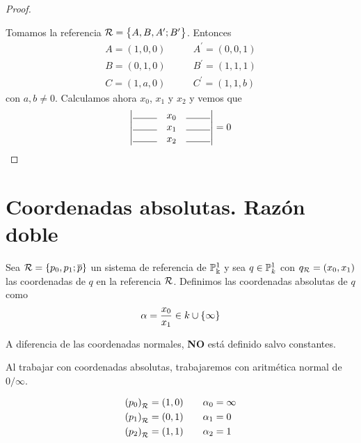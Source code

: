 \begin{proof}
\begin{center}
\end{center}

Tomamos la referencia $\mathcal{R} = \left\{A,B,A^\prime;B^\prime\right\}$. Entonces
\[
\begin{aligned}
A = (1,0,0) &\qquad A^\prime = (0,0,1) \\
B = (0,1,0) &\qquad B^\prime = (1,1,1) \\
C = (1,a,0) &\qquad C^\prime = (1,1,b)
\end{aligned}
\]
con $a,b \neq 0$. Calculamos ahora $x_0$, $x_1$ y $x_
2$ y vemos que
\[
  \determinant{\line(1,0){25} & x_0 & \line(1,0){25} \\
    \line(1,0){25} & x_1 & \line(1,0){25} \\ \line(1,0){25} & x_2 & \line(1,0){25}} = 0
\]
\end{proof}


\section{Coordenadas absolutas. Razón doble}

\begin{defi}
  Sea $\mathcal{R} = \left\{p_0,p_1;\overline{p}\right\}$ un sistema de referencia de $\mathbb{P}^1_\Bbbk$ y
  sea $q \in \mathbb{P}^1_k$ con $q_{\mathcal{R}} = (x_0,x_1)$ las coordenadas de $q$ en la
  referencia $\mathcal{R}$. Definimos las coordenadas absolutas de $q$ como
  \[
    \alpha = \frac{x_0}{x_1} \in k \cup \left\{\infty\right\}
  \]
\end{defi}

\begin{obs}
  A diferencia de las coordenadas normales, \textbf{NO} está definido salvo constantes.
\end{obs}
\begin{obs}
  Al trabajar con coordenadas absolutas, trabajaremos con aritmética normal de $0/\infty$.
\end{obs}
\begin{obs}
  \[
    \begin{aligned}
      \left( p_0 \right)_{\mathcal{R}} = (1,0) &\qquad \alpha_0 = \infty \\
      \left( p_1 \right)_{\mathcal{R}} = (0,1) &\qquad \alpha_1 = 0 \\
      \left( p_2 \right)_{\mathcal{R}} = (1,1) &\qquad \alpha_2 = 1 \\
    \end{aligned}
  \]
\end{obs}

